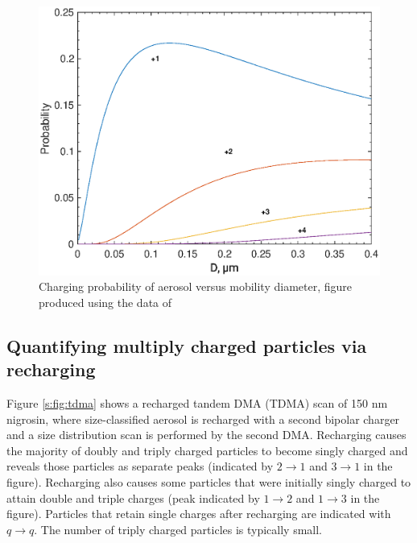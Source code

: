 \documentclass[12pt]{article}
\begin{document}
\begin{figure}[htp]
\centering
\includegraphics[scale=0.7]{images/fig_supp_probability.eps}
\caption{Charging probability of aerosol versus mobility diameter, figure produced using the data of \citet{RN10}}
\label{s:fig:probability}
\end{figure}

\subsection{Quantifying multiply charged particles via recharging}

Figure \ref{s:fig:tdma} shows a recharged tandem DMA (TDMA) scan of 150 nm nigrosin, where size-classified aerosol is recharged with a second bipolar charger and a size distribution scan is performed by the second DMA. Recharging causes the majority of doubly and triply charged particles to become singly charged and reveals those particles as separate peaks (indicated by $2\rightarrow 1$ and $3\rightarrow 1$ in the figure). Recharging also causes some particles that were initially singly charged to attain double and triple charges (peak indicated by $1\rightarrow 2$ and $1\rightarrow 3$ in the figure). Particles that retain single charges after recharging are indicated with $q\rightarrow q$. The number of triply charged particles is typically small.
\end{document}
